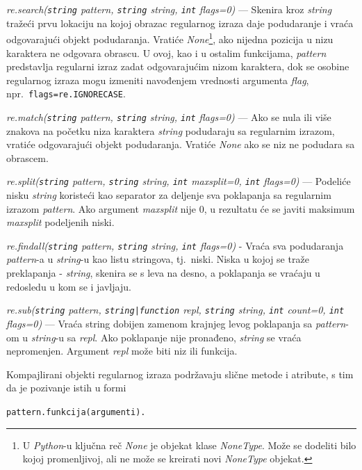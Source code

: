 \documentclass[12pt,oneside]{memoir}
\theoremstyle{plain}
\theoremstyle{definition}
\begin{document}
\begin{description}
\item  \textit{re.search(\texttt{string} pattern, \texttt{string} string, \texttt{int} flags=0)} --- Skenira kroz \textit{string} tražeći prvu lokaciju na kojoj obrazac regularnog izraza daje podudaranje i vraća odgovarajući objekt podudaranja. Vratiće \textit{None}\footnote{U \textit{Python}-u ključna reč \textit{None} je objekat klase \textit{NoneType}. Može se dodeliti bilo kojoj promenljivoj, ali ne može se kreirati novi \textit{NoneType} objekat.}, ako nijedna pozicija u nizu karaktera ne odgovara obrascu. U ovoj, kao i u ostalim funkcijama, \textit{pattern} predstavlja regularni izraz zadat odgovarajućim nizom karaktera, dok se osobine regularnog izraza mogu izmeniti navođenjem vrednosti argumenta \textit{flag}, npr.~\texttt{flags=re.IGNORECASE}.
\item  \textit{re.match(\texttt{string} pattern, \texttt{string} string, \texttt{int} flags=0)} --- Ako se nula ili više znakova na početku niza karaktera \textit{string}  podudaraju sa regularnim izrazom, vratiće odgovarajući objekt podudaranja. Vratiće \textit{None} ako se niz ne podudara sa obrascem.
\item  \textit{re.split(\texttt{string} pattern, \texttt{string} string, \texttt{int} maxsplit=0, \texttt{int} flags=0)} --- Podeliće nisku \textit{string} koristeći kao separator za deljenje sva poklapanja sa regularnim izrazom \textit{pattern}. Ako argument \textit{maxsplit} nije 0, u rezultatu će se javiti maksimum \textit{maxsplit} podeljenih niski.  
\item  \textit{re.findall(\texttt{string} pattern, \texttt{string} string, \texttt{int} flags=0)} - Vraća sva podudaranja \textit{pattern}-a u \textit{string}-u kao listu stringova, tj.~niski. Niska u kojoj se traže preklapanja - \textit{string}, skenira se s leva na desno, a poklapanja se vraćaju u redosledu u kom se i javljaju. 
\item  \textit{re.sub(\texttt{string} pattern, \texttt{string|function} repl, \texttt{string} string, \texttt{int} count=0, \texttt{int} flags=0)} --- Vraća string dobijen zamenom krajnjeg levog poklapanja sa \textit{pattern}-om u \textit{string}-u sa \textit{repl}. Ako poklapanje nije pronađeno, \textit{string} se vraća nepromenjen. Argument \textit{repl} može biti niz ili funkcija.
\end{description}

Kompajlirani objekti regularnog izraza podržavaju slične metode i atribute, s tim da je pozivanje istih u formi
\begin{center}
\texttt{pattern.funkcija(argumenti).}
\end{center}
\end{document}
